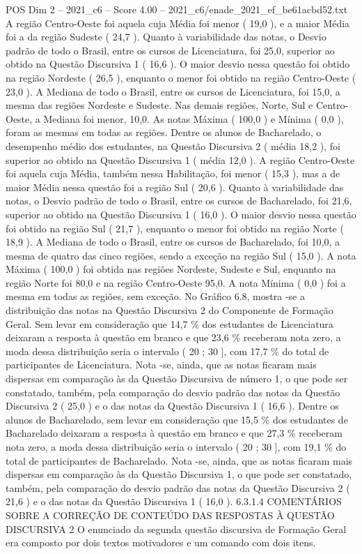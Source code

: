 \begin{textsample}{POS Dim 2 – 2021\_c6 – Score 4.00 – 2021\_c6/enade\_2021\_ef\_be61acbd52.txt}
A região Centro-Oeste foi aquela cuja Média foi menor ( 19,0 ), e a maior Média foi a da região Sudeste ( 24,7 ).
Quanto à variabilidade das notas, o Desvio padrão de todo o Brasil, entre os cursos de Licenciatura, foi 25,0, superior ao obtido na Questão Discursiva 1 ( 16,6 ).
O maior desvio nessa questão foi obtido na região Nordeste ( 26,5 ), enquanto o menor foi obtido na região Centro-Oeste ( 23,0 ).
A Mediana de todo o Brasil, entre os cursos de Licenciatura, foi 15,0, a mesma das regiões Nordeste e Sudeste.
Nas demais regiões, Norte, Sul e Centro-Oeste, a Mediana foi menor, 10,0.
As notas Máxima ( 100,0 ) e Mínima ( 0,0 ), foram as mesmas em todas as regiões.
Dentre os alunos de Bacharelado, o desempenho médio dos estudantes, na Questão Discursiva 2 ( média 18,2 ), foi superior ao obtido na Questão Discursiva 1 ( média 12,0 ).
A região Centro-Oeste foi aquela cuja Média, também nessa Habilitação, foi menor ( 15,3 ), mas a de maior Média nessa questão foi a região Sul ( 20,6 ).
Quanto à variabilidade das notas, o Desvio padrão de todo o Brasil, entre os cursos de Bacharelado, foi 21,6, superior ao obtido na Questão Discursiva 1 ( 16,0 ).
O maior desvio nessa questão foi obtido na região Sul ( 21,7 ), enquanto o menor foi obtido na região Norte ( 18,9 ).
A Mediana de todo o Brasil, entre os cursos de Bacharelado, foi 10,0, a mesma de quatro das cinco regiões, sendo a exceção na região Sul ( 15,0 ).
A nota Máxima ( 100,0 ) foi obtida nas regiões Nordeste, Sudeste e Sul, enquanto na região Norte foi 80,0 e na região Centro-Oeste 95,0.
A nota Mínima ( 0,0 ) foi a mesma em todas as regiões, sem exceção.
No Gráfico 6.8, mostra -se a distribuição das notas na Questão Discursiva 2 do Componente de Formação Geral.
Sem levar em consideração que 14,7 \% dos estudantes de Licenciatura deixaram a resposta à questão em branco e que 23,6 \% receberam nota zero, a moda dessa distribuição seria o intervalo ( 20 ; 30 ], com 17,7 \% do total de participantes de Licenciatura.
Nota -se, ainda, que as notas ficaram mais dispersas em comparação às da Questão Discursiva de número 1, o que pode ser constatado, também, pela comparação do desvio padrão das notas da Questão Discursiva 2 ( 25,0 ) e o das notas da Questão Discursiva 1 ( 16,6 ).
Dentre os alunos de Bacharelado, sem levar em consideração que 15,5 \% dos estudantes de Bacharelado deixaram a resposta à questão em branco e que 27,3 \% receberam nota zero, a moda dessa distribuição seria o intervalo ( 20 ; 30 ], com 19,1 \% do total de participantes de Bacharelado.
Nota -se, ainda, que as notas ficaram mais dispersas em comparação às da Questão Discursiva 1, o que pode ser constatado, também, pela comparação do desvio padrão das notas da Questão Discursiva 2 ( 21,6 ) e o das notas da Questão Discursiva 1 ( 16,0 ). 6.3.1.4 COMENTÁRIOS SOBRE A CORREÇÃO DE CONTEÚDO DAS RESPOSTAS À QUESTÃO DISCURSIVA 2 O enunciado da segunda questão discursiva de Formação Geral era composto por dois textos motivadores e um comando com dois itens.

\end{textsample}
